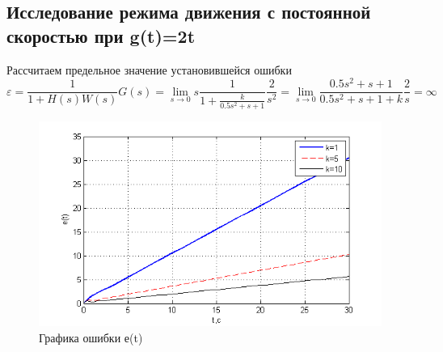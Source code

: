 \documentclass[a4paper, 11pt]{article}
\begin{document}
\subsection*{Исследование режима движения с постоянной скоростью при g(t)=2t}\hfill\par
Рассчитаем предельное значение установившейся ошибки\\
\begin{equation}
\varepsilon  = \frac{1}{{1 + H\left( s \right)W\left( s \right)}}G\left( s \right) = \mathop {\lim }\limits_{s \to 0} s\frac{1}{{1 + \frac{k}{{0.5{s^2} + s + 1}}}}\frac{2}{{{s^2}}} = \mathop {\lim }\limits_{s \to 0} \frac{{0.5{s^2} + s + 1}}{{0.5{s^2} + s + 1 + k}}\frac{2}{s} = \infty 
\end{equation}
\begin{center}

	\begin{figure}[h]
		\centering
			\includegraphics[width=0.7\linewidth]{33}
		\caption{Графика ошибки е(t)}
		\label{fig:33}
	\end{figure}
\end{center}
\end{document}
